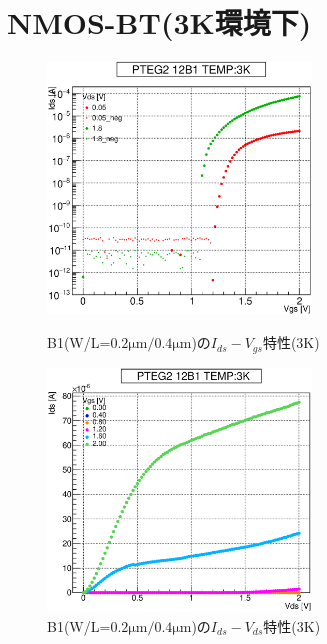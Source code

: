 		\section{NMOS-BT(3K環境下)}
				\begin{figure}[htbp]
					\begin{minipage}{0.5\hsize}
						\begin{center}
							\includegraphics[width=70mm]{./Chapter/Appendix/Picture/NBT/B1/PTEG2_12_B1_IdVg_3K.eps}
						\end{center}
						\caption{B1(W/L=$0.2\mathrm{\mu m}/0.4\mathrm{\mu m}$)の$I_{ds}-V_{gs}$特性(3K)}
						\label{fig:B1_IdVg_3K}
					\end{minipage}
					\begin{minipage}{0.5\hsize}
						\begin{center}
							\includegraphics[width=70mm]{./Chapter/Appendix/Picture/NBT/B1/PTEG2_12_B1_IdVd_3K.eps}
						\end{center}
						\caption{B1(W/L=$0.2\mathrm{\mu m}/0.4\mathrm{\mu m}$)の$I_{ds}-V_{ds}$特性(3K)}
						\label{fig:B1_IdVd_3K}
					\end{minipage}
				\end{figure}
